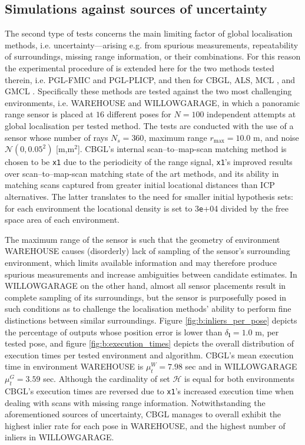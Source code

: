 \subsection{Simulations against sources of uncertainty}
\label{subsec:exp_b}

The second type of tests concerns the main limiting factor of global
localisation methods, i.e. uncertainty---arising e.g. from spurious
measurements, repeatability of surroundings, missing range information, or
their combinations. For this reason the experimental procedure of
\cite{Filotheou2022g} is extended here for the two methods tested therein,
i.e. PGL-FMIC and PGL-PLICP, and then for CBGL, ALS, MCL \cite{mcl}, and GMCL
\cite{gmcl}.  Specifically these methods are tested against the two most
challenging environments, i.e. WAREHOUSE and WILLOWGARAGE, in which a panoramic
range sensor is placed at $16$ different poses for $N = 100$ independent
attempts at global localisation per tested method. The tests are conducted with
the use of a sensor whose number of rays $N_s = 360$, maximum range
$r_{\max} = 10.0$ m, and noise $\mathcal{N}(0, 0.05^2)$ [m,m$^2$]. CBGL's
internal scan--to--map-scan matching method is chosen to be \texttt{x1}
\cite{Filotheou2023a} due to the periodicity of the range signal,
\texttt{x1}'s improved results over scan--to--map-scan matching state of the
art methods, and its ability in matching scans captured from greater initial
locational distances than ICP alternatives. The latter translates to the need
for smaller initial hypothesis sets: for each environment the locational
density is set to $3$\texttt{e}+04 divided by the free space area of each
environment.

The maximum range of the sensor is such that the geometry of environment
WAREHOUSE causes (disorderly) lack of sampling of the sensor's surrounding
environment, which limits available information and may therefore produce
spurious measurements and increase ambiguities between candidate estimates. In
WILLOWGARAGE on the other hand, almost all sensor placements result in complete
sampling of its surroundings, but the sensor is purposefully posed in such
conditions as to challenge the localisation methods' ability to perform fine
distinctions between similar surroundings. Figure \ref{fig:b:inliers_per_pose}
depicts the percentage of outputs whose position error is lower than
$\delta_{\bm{l}} = 1.0$ m, per tested pose, and figure
\ref{fig:b:execution_times} depicts the overall distribution of execution times
per tested environment and algorithm. CBGL's mean execution time in environment
WAREHOUSE is $\mu_t^W = 7.98$ sec and in WILLOWGARAGE $\mu_t^{G} = 3.59$ sec.
Although the cardinality of set $\mathcal{H}$ is equal for both environments
CBGL's execution times are reversed due to \texttt{x1}'s increased execution
time when dealing with scans with missing range information. Notwithstanding
the aforementioned sources of uncertainty, CBGL manages to overall exhibit the
highest inlier rate for each pose in WAREHOUSE, and the highest number of
inliers in WILLOWGARAGE.


